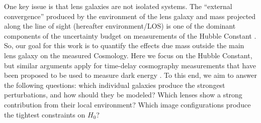 One key issue is that lens galaxies are not isolated systems. The ``external convergence'' produced by the environment of the lens galaxy and mass projected along the line of sight (hereafter environment/LOS) is one of the dominant components of the uncertainty budget on measurements of the Hubble Constant \citep{Suyu12}. So, our goal for this work is to quantify the effects due mass outside the main lens galaxy on the measured Cosmology. Here we focus on the Hubble Constant, but similar arguments apply for time-delay cosmography measurements that have been proposed to be used to measure dark energy \citet{Treu13}. To this end, we aim to answer the following questions: which individual galaxies produce the strongest perturbations, and how should they be modeled? Which lenses show a strong contribution from their local environment? Which image configurations produce the tightest constraints on $H_0$?
